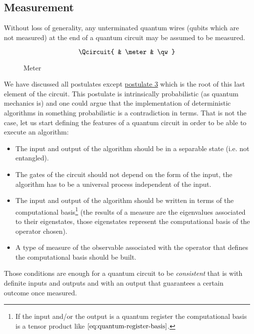 \subsection{Measurement}
\begin{theorem}
Without loss of generality, any unterminated quantum wires (qubits which are not measured) at the end of a quantum circuit may be assumed to be measured. \cite{Shankar}
\end{theorem}
\begin{figure}[htb]
\[ \Qcircuit {
     & \meter & \qw
}\]
\caption{Meter}
\label{fig:measurement}
\end{figure}
We have discussed all postulates except \hyperref[postulate:3]{postulate 3} which is the root of this last element of the circuit.
This postulate is intrinsically probabilistic (as quantum mechanics is) and one could argue that the implementation of deterministic algorithms in something probabilistic is a contradiction in terms.
That is not the case, let us start defining the features of a quantum circuit in order to be able to execute an algorithm:
\begin{itemize}
    \item The input and output of the algorithm should be in a separable state (i.e. not entangled).
    \item The gates of the circuit should not depend on the form of the input, the algorithm has to be a universal process independent of the input.
    \item The input and output of the algorithm should be written in terms of the computational basis\footnote{If the input and/or the output is a quantum register the computational basis is a tensor product like $\eqref{eq:quantum-register-basis}$.} (the results of a measure are the eigenvalues associated to their eigenstates, those eigenstates represent the computational basis of the operator chosen).
    \item A type of measure of the observable associated with the operator that defines the computational basis should be built.
\end{itemize}

Those conditions are enough for a quantum circuit to be \emph{consistent} that is with definite inputs and outputs and with an output that guarantees a certain outcome once measured.
